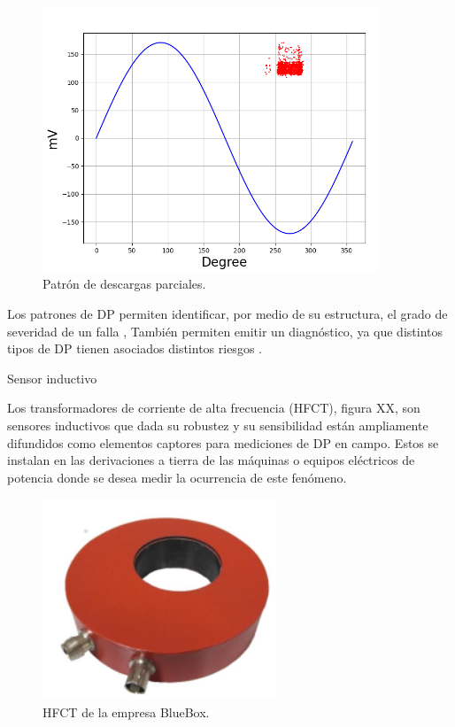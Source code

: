 \begin{figure}[!ht]
	\centering
	\includegraphics[width=100mm]{./Figures/patronEjemplo.png}
	\caption{Patrón de descargas parciales.}
	\label{fig:patronEjemplo}
\end{figure}

Los patrones de DP permiten identificar, por medio de su estructura, el grado de severidad de un falla \citep{Gulski:citation}, También permiten emitir un diagnóstico, ya que distintos tipos de DP tienen asociados distintos riesgos \citep{Cavallini:citation}.

Sensor inductivo

Los transformadores de corriente de alta frecuencia (HFCT), figura XX, son sensores inductivos que dada su robustez y su sensibilidad están ampliamente difundidos como elementos captores para mediciones de DP en campo. Estos se instalan en las derivaciones a tierra de las máquinas o equipos eléctricos de potencia donde se desea medir la ocurrencia de este fenómeno.


\begin{figure}[ht]
	\centering
	\includegraphics[width=70mm]{./Figures/hfct.png}
	\caption{HFCT de la empresa BlueBox.}
	\label{fig:hfct}
\end{figure}

